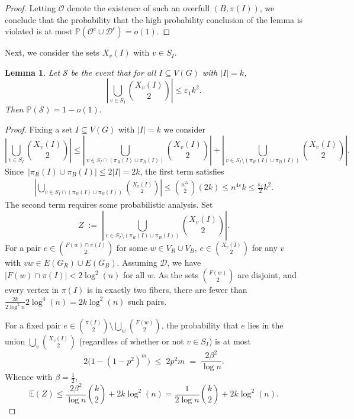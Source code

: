 \documentclass{article}
\newcommand{\p}{\mathbb{P}}
\newcommand{\E}{\mathbb{E}}
\newtheorem{lemma}[theorem]{Lemma}
\begin{document}
\begin{proof}
Letting $\mathcal{O}$ denote the existence of such an overfull $(B,\pi(I))$, we conclude that the probability that the high probability conclusion of the lemma is violated is at most $\p(\mathcal{O}^c \cup \mathcal{D}^{c}) = o(1).$
\end{proof} 


Next, we consider the sets $X_v(I)$ with $v \in S_{I}$.   
\begin{lemma} \label{lem:small} 	
	Let $\mathcal{S}$ be the event that for all $I \subseteq V(G)$ with $|I|=k$,
	\[
	\left| \bigcup_{v \in S_I} {X_{v}(I)\choose 2} \right|  \leq \varepsilon_1 k^2.  
	\]
	Then $\p(\mathcal{S}) = 1-o(1).$ 
\end{lemma} 
\begin{proof} 
Fixing a set $I \subseteq V(G)$ with $|I|=k$ we consider
\[
	\left| \bigcup_{v \in S_I} {X_{v}(I)\choose 2} \right|  \leq \left| \bigcup_{v \in S_I \cap (\pi_R(I) \cup \pi_B(I))} \binom{X_v(I)}{2} \right| + \left| \bigcup_{v \in S_I \setminus (\pi_R(I) \cup \pi_B(I))} \binom{X_{v}(I)}{2} \right|.  
\]
Since~$|\pi_R(I) \cup \pi_B(I)| \leq 2|I| =2k$, the first term satisfies
\begin{align}\label{internalS_I}
    \left| \bigcup_{v \in S_I \cap (\pi_R(I) \cup \pi_B(I))} \binom{X_v(I)}{2} \right| \leq \binom{n^{2\varepsilon}}{2} (2k) \leq n^{4\varepsilon} k \leq \frac{\varepsilon_1}{2} k^2.  
\end{align}
The second term requires some probabilistic analysis. 
Set
\[
  Z \;:=\; \left| \bigcup_{v \in S_I \setminus (\pi_R(I) \cup \pi_B(I))} \binom{X_{v}(I)}{2} \right|.
\]
For a pair $e\in {F(w)\cap \pi(I)\choose 2}$ for some $w\in V_R\cup V_B$, $e\in {X_v(I)\choose 2}$ for any $v$ with $vw\in E(G_R)\cup E(G_B)$. Assuming $\mathcal{D}$, 
we have $|F(w)\cap \pi(I)|<2\log^2(n)$ for all $w$. As the sets ${F(w)\choose 2}$ are disjoint, and every vertex in $\pi(I)$ is in exactly two fibers,
there are fewer than $\frac{2k}{2\log^2{n}}2\log^4(n)=2k\log^2(n)$ such pairs.

For a fixed pair $e\in \binom{\pi(I)}{2}\setminus\bigcup_w {F(w)\choose 2}$, the probability that $e$ lies in the union
$\bigcup_{v} \binom{X_v(I)}{2}$ (regardless of whether or not $v\in S_I$) is at most
\[
  2\bigl(1-(1-p^2)^{m}\bigr)\;\le\; 2p^2{m} \;=\; \frac{2\beta^2}{\log n}.
\]
Whence with $\beta=\tfrac12$,
\[
  \E (Z) \leq \frac{2\beta^2}{\log n}\binom{k}{2}+2k\log^2(n)=\frac{1}{2\log n}\binom{k}{2}+2k\log^2(n).
\]



\end{proof}
\end{document}
